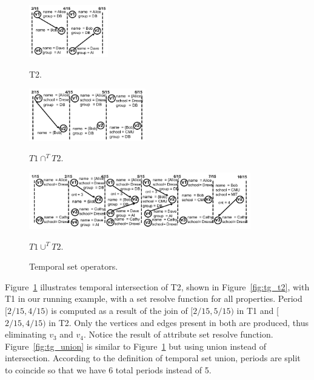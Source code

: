 \begin{figure}
\begin{minipage}{1.4in}
\includegraphics[width=1.35in]{figs/T2_graphs.pdf}
\caption{T2.}
\vspace{-0.2cm}
\label{fig:tg_t2}
\end{minipage}
\begin{minipage}{2in}
\includegraphics[width=2in]{figs/T1_inter_T2.pdf}
\caption{$T1 \cap^T T2$.}
\vspace{-0.2cm}
\label{fig:tg_inter}
\end{minipage}
\begin{minipage}{3.8in}
\includegraphics[width=3.8in]{figs/T1_union_T2.pdf}
\caption{$T1 \cup^T T2.$}
\vspace{-0.2cm}
\label{fig:tg_union}
\end{minipage}
\caption{Temporal set operators.}
\label{fig:intersect}
\vspace{-0.2cm}
\end{figure}

Figure~\ref{fig:intersect} illustrates temporal intersection of \tg
T2, shown in Figure~\ref{fig:tg_t2}, with T1 in our running example,
with a set resolve function for all properties.  Period $[2/15, 4/15)$
  is computed as a result of the join of $[2/15, 5/15)$ in T1 and
    [$2/15, 4/15)$ in T2.  Only the vertices and edges present in both
      \tgs are produced, thus eliminating $v_3$ and $v_4$.  Notice the
      result of attribute set resolve function.
      Figure~\ref{fig:tg_union} is similar to
      Figure~\ref{fig:intersect} but using union instead of
      intersection.  According to the definition of temporal set
      union, periods are split to coincide so that we have 6 total
      periods instead of 5.

